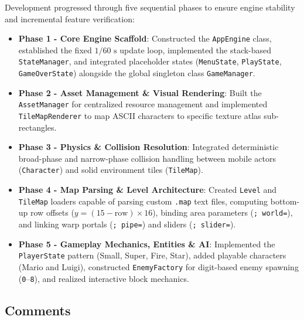 \documentclass[12pt, a4paper]{article}
\begin{document}
Development progressed through five sequential phases to ensure engine stability and incremental feature verification:
\begin{itemize}
\item \textbf{Phase 1  -  Core Engine Scaffold}: Constructed the \texttt{AppEngine} class, established the fixed $1/60\text{ s}$ update loop, implemented the stack-based \texttt{StateManager}, and integrated placeholder states (\texttt{MenuState}, \texttt{PlayState}, \texttt{GameOverState}) alongside the global singleton class \texttt{GameManager}.
\item \textbf{Phase 2  -  Asset Management \& Visual Rendering}: Built the \texttt{AssetManager} for centralized resource management and implemented \texttt{TileMapRenderer} to map ASCII characters to specific texture atlas sub-rectangles.
\item \textbf{Phase 3  -  Physics \& Collision Resolution}: Integrated deterministic broad-phase and narrow-phase collision handling between mobile actors (\texttt{Character}) and solid environment tiles (\texttt{TileMap}).
\item \textbf{Phase 4  -  Map Parsing \& Level Architecture}: Created \texttt{Level} and \texttt{TileMap} loaders capable of parsing custom \texttt{.map} text files, computing bottom-up row offsets ($y = (15 - \text{row}) \times 16$), binding area parameters (\texttt{; world=}), and linking warp portals (\texttt{; pipe=}) and sliders (\texttt{; slider=}).
\item \textbf{Phase 5  -  Gameplay Mechanics, Entities \& AI}: Implemented the \texttt{PlayerState} pattern (Small, Super, Fire, Star), added playable characters (Mario and Luigi), constructed \texttt{EnemyFactory} for digit-based enemy spawning (\texttt{0}--\texttt{8}), and realized interactive block mechanics.
\end{itemize}

\newpage

\subsection{Comments}
\end{document}
